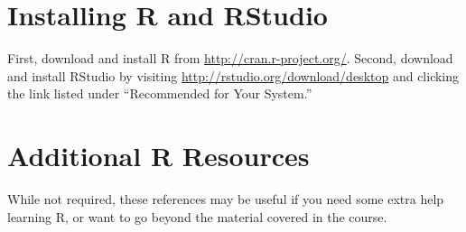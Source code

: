 \documentclass[11pt, letterpaper]{article}
\begin{document}
            
\section*{Installing R and RStudio} First, download and install R from \url{http://cran.r-project.org/}. Second, download and install RStudio by visiting \url{http://rstudio.org/download/desktop} and clicking the link listed under ``Recommended for Your System.'' 

\bigskip

\section*{Additional R Resources} While not required, these references may be useful if you need some extra help learning R, or want to go beyond the material covered in the course.
\end{document}
